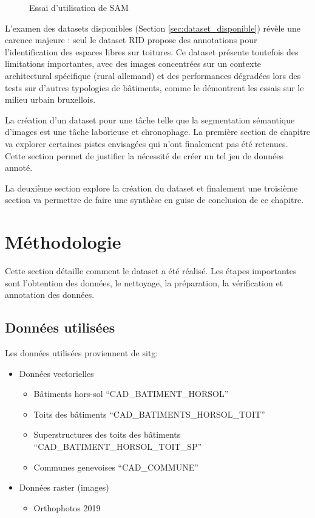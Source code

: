 \begin{figure}[H]
    \caption{Essai d'utilisation de SAM}
    \label{fig:essai_algo_sam}
\end{figure}








L'examen des datasets disponibles (Section \ref{sec:dataset_disponible}) révèle une carence majeure : seul le dataset RID propose des annotations pour l'identification des espaces libres sur toitures. Ce dataset présente toutefois des limitations importantes, avec des images concentrées sur un contexte architectural spécifique (rural allemand) et des performances dégradées lors des tests sur d'autres typologies de bâtiments, comme le démontrent les essais sur le milieu urbain bruxellois.

La création d'un dataset pour une tâche telle que la segmentation sémantique d'images est une tâche laborieuse et chronophage. La première section de chapitre va explorer certaines pistes envisagées qui n'ont finalement pas été retenues. Cette section permet de justifier la nécessité de créer un tel jeu de données annoté.

La deuxième section explore la création du dataset et finalement une troisième section va permettre de faire une synthèse en guise de conclusion de ce chapitre.

\section{Méthodologie}
Cette section détaille comment le dataset a été réalisé. Les étapes importantes sont l'obtention des données, le nettoyage, la préparation, la vérification et annotation des données.
\subsection{Données utilisées}
Les données utilisées proviennent de \acrshort{sitg}:
\begin{itemize}
    \item Données vectorielles
    \begin{itemize}
        \item Bâtiments hors-sol ``CAD\_BATIMENT\_HORSOL'' \cite{sitg_batiments_nodate}
        \item Toits des bâtiments ``CAD\_BATIMENTS\_HORSOL\_TOIT'' \cite{sitg_toits_nodate}
        \item Superstructures des toits des bâtiments ``CAD\_BATIMENT\_HORSOL\_TOIT\_SP'' \cite{sitg_superstructures_nodate}
        \item Communes genevoises ``CAD\_COMMUNE'' \cite{sitg_communes_nodate}
    \end{itemize}
    \item Données raster (images)
    \begin{itemize}
        \item Orthophotos 2019 \cite{sitg_orthophotos_nodate}
    \end{itemize}
\end{itemize}

